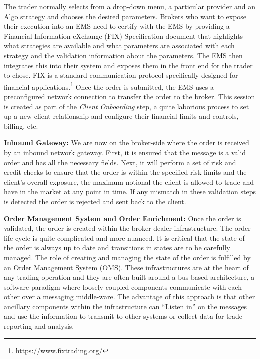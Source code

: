 The trader normally selects from a drop-down menu, a particular provider and an Algo strategy and  chooses the desired parameters. Brokers who want to expose their execution into an EMS need to certify with the EMS by providing a Financial Information eXchange (FIX) Specification document that highlights what strategies are available and what parameters are associated with each strategy and the validation information about the parameters. The EMS then integrates this into their system and exposes them in the front end for the trader to chose. FIX is a standard communication protocol specifically designed for financial applications.\footnote{\url{https://www.fixtrading.org/}} Once the order is submitted, the EMS uses a preconfigured network connection to transfer the order to the broker. This session is created as part of the \emph{Client Onboarding} step, a quite laborious process to set up a new client relationship and configure their financial limits and controls, billing, etc. \twomedskip


\noindent\textbf{Inbound Gateway:} We are now on the broker-side where the order is received by an inbound network gateway. First, it is ensured that the message is a valid order and has all the necessary fields. Next, it will perform a set of risk and credit checks to ensure that the order is within the specified risk limits and the client's overall exposure, the maximum notional the client is allowed to trade and have in the market at any point in time. If any mismatch in these validation steps is detected the order is rejected and sent back to the client. \twomedskip


\noindent\textbf{Order Management System and Order Enrichment:} Once the order is validated, the order is created within the broker dealer infrastructure. The order life-cycle is quite complicated and more nuanced. It is critical that the state of the order is always up to date and transitions in states are to be carefully managed. The role of creating and managing the state of the order is fulfilled by an Order Management System (OMS). These infrastructures are at the heart of any trading operation and they are often built around a bus-based architecture, a software paradigm where loosely coupled components communicate with each other over a messaging middle-ware. The advantage of this approach is that other ancillary components within the infrastructure can ``Listen in'' on the messages and use the information to transmit to other systems or collect data for trade reporting and analysis.


